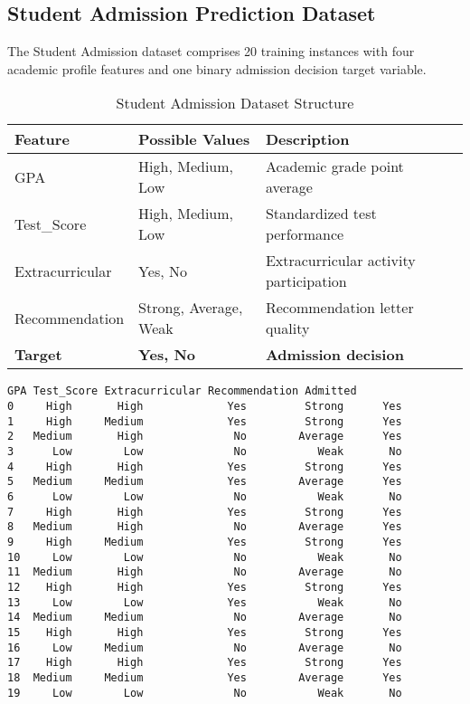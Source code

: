 \documentclass[11pt,a4paper]{article}
\begin{document}
\subsection{Student Admission Prediction Dataset}

The Student Admission dataset comprises 20 training instances with four academic profile features and one binary admission decision target variable.

\begin{table}[H]
\centering
\caption{Student Admission Dataset Structure}
\begin{tabular}{|l|l|l|}
\hline
\textbf{Feature} & \textbf{Possible Values} & \textbf{Description} \\
\hline
GPA & High, Medium, Low & Academic grade point average \\
Test\_Score & High, Medium, Low & Standardized test performance \\
Extracurricular & Yes, No & Extracurricular activity participation \\
Recommendation & Strong, Average, Weak & Recommendation letter quality \\
\textbf{Target} & \textbf{Yes, No} & \textbf{Admission decision} \\
\hline
\end{tabular}
\end{table}

\begin{lstlisting}[caption=Complete Student Admission Dataset Output]
        GPA Test_Score Extracurricular Recommendation Admitted
0     High       High             Yes         Strong      Yes
1     High     Medium             Yes         Strong      Yes
2   Medium       High              No        Average      Yes
3      Low        Low              No           Weak       No
4     High       High             Yes         Strong      Yes
5   Medium     Medium             Yes        Average      Yes
6      Low        Low              No           Weak       No
7     High       High             Yes         Strong      Yes
8   Medium       High              No        Average      Yes
9     High     Medium             Yes         Strong      Yes
10     Low        Low              No           Weak       No
11  Medium       High              No        Average       No
12    High       High             Yes         Strong      Yes
13     Low        Low             Yes           Weak       No
14  Medium     Medium              No        Average       No
15    High       High             Yes         Strong      Yes
16     Low     Medium              No        Average       No
17    High       High             Yes         Strong      Yes
18  Medium     Medium             Yes        Average      Yes
19     Low        Low              No           Weak       No
\end{lstlisting}
\end{document}
